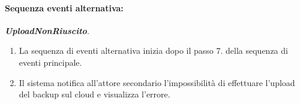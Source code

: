 \documentclass{article}
\begin{document}
    	\paragraph{Sequenza eventi alternativa:} \textbf{\textit{UploadNonRiuscito}}.
	\begin{enumerate}[itemsep=8pt,parsep=0pt]
	\item La sequenza di eventi alternativa inizia dopo il passo 7. della sequenza di eventi principale.
	\item Il sistema notifica all'attore secondario l'impossibilità di effettuare l'upload del backup sul cloud e visualizza l'errore.
	\end{enumerate}
\end{document}
